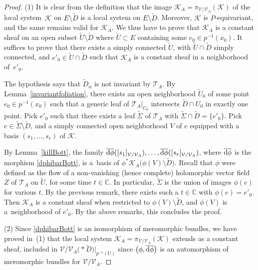 \documentclass[pdftex]{sigma}
\numberwithin{equation}{section}
\begin{document}
\begin{proof}
(1) It is clear from the definition that the image $\mathcal{K}_A=\pi_{\mathcal{V}/\mathcal{V}_A}(\mathcal{K})$ of the local system~$\mathcal{K}$ on $E\setminus \tilde{D}$ is a local system on $E\setminus \tilde{D}$. Moreover, $\mathcal{K}$ is $P$-equivariant, and the same remains valid for $\mathcal{K}_A$. We thus have to prove that $\mathcal{K}_A$ is a constant sheaf on an open subset $\tilde{U}\setminus \tilde{D}$ where $\tilde{U}\subset E$ containing some $e_0 \in p^{-1}(x_0)$. It suffices to prove that there exists a simply connected $\tilde{U}$, with $\tilde{U}\cap \tilde{D}$ simply connected, and $e'_0 \in \tilde{U}\cap \tilde{D}$ such that $\mathcal{K}_A$ is a constant sheaf in a neighborhood of~$e'_0$.

The hypothesis says that $\tilde{D}_\alpha$ is not invariant by $\mathcal{T}_A$. By Lemma~\ref{invariantfoliation}, there exists an open neighborhood $\tilde{U}_0$ of some point $e_0 \in p^{-1}(x_0)$ such that a generic leaf of $\mathcal{T}_A\vert_{U_0}$ intersects $\tilde{D}\cap U_0$ in exactly one point. Pick $e'_0$ such that there exists a leaf $\tilde{\Sigma}$ of $\mathcal{T}_A$ with $\tilde{\Sigma}\cap \tilde{D} = \{e'_0\}$. Pick $e\in \tilde{\Sigma}\setminus \tilde{D}$, and a simply connected open neighborhood $V$ of $e$ equipped with a basis $(s_1,\dots,s_r)$ of $\mathcal{K}$.


By Lemma~\ref{killBott}, the family $\overline{{\rm d}\phi}([s_1]_{\mathcal{V}/\mathcal{V}_A}),\dots,\overline{{\rm d}\phi}([s_r]_{\mathcal{V}/\mathcal{V}_A})$, where $\overline{{\rm d}\phi}$ is the morphism \eqref{dphibarBott}, is a~basis of $\phi^*\mathcal{K}_A\big(\phi(V)\setminus \tilde{D}\big)$. Recall that $\phi$ were defined as the flow of a non-vanishing (hence complete) holomorphic vector field $Z$ of $ \mathcal{T}_A$ on $\tilde{U}$, for some time $t\in \mathbb{C}$. In particular, $\tilde{\Sigma}$ is the union of images $\phi(e)$ for various $t$. By the previous remark, there exists such a $t\in \mathbb{C}$ with $\phi(e)=e'_0$. Then $\mathcal{K}_A$ is a constant sheaf when restricted to $\phi(V)\setminus \tilde{D}$, and $\phi(V)$ is a~neighborhood of $e'_0$. By the above remarks, this concludes the proof. %

(2) Since \eqref{dphibarBott} is an isomorphism of meromorphic bundles, we have proved in~(1) that the local system $\mathcal{K}_A=\pi_{\mathcal{V}/\mathcal{V}_A}(\mathcal{K})$ extends as a constant sheaf, included in $\mathcal{V}/\mathcal{V}_A\bigl(* \tilde{D}\bigr)\vert_{p^{-1}(U)}$ since $\big(\phi,\overline{{\rm d}\phi}\big)$ is an automorphism of meromorphic bundles for $\mathcal{V}/\mathcal{V}_A$.


\end{proof}
\end{document}
